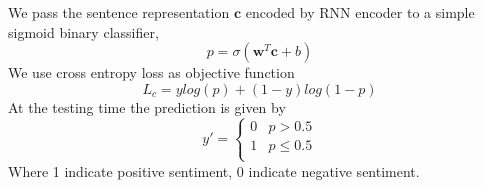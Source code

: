 \noindent
We pass the sentence representation $\mathbf{c}$ encoded by RNN encoder to a simple sigmoid binary classifier, 
\begin{equation}
p = \sigma(\mathbf{w}^{T}\mathbf{c}+b)
\end{equation}
We use cross entropy loss as objective function
\begin{equation}
L_{c} = ylog(p) + (1-y)log(1-p)
\end{equation}
At the testing time the prediction is given by
\begin{equation}
y' = \begin{cases}
0 &  p > 0.5 \\
1 &  p \leq 0.5 \\
\end{cases}
\end{equation}
Where 1 indicate positive sentiment, 0 indicate negative sentiment.
